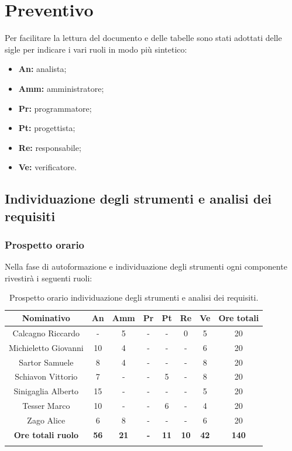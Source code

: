\section{Preventivo}

	Per facilitare la lettura del documento e delle tabelle sono stati adottati delle sigle per indicare i vari ruoli in modo più sintetico:
	\begin{itemize}
		\item \textbf{An:} analista;
		\item \textbf{Amm:} amministratore;
		\item \textbf{Pr:} programmatore;
		\item \textbf{Pt:} progettista;
		\item \textbf{Re:} responsabile;
		\item \textbf{Ve:} verificatore.
	\end{itemize}

%
%
%
%
\subsection{Individuazione degli strumenti e analisi dei requisiti}

\subsubsection{Prospetto orario}

Nella fase di autoformazione e individuazione degli strumenti ogni componente rivestirà i seguenti ruoli:
\begin{longtable}{|c|c|c|c|c|c|c|c|}
	\hline
	\rowcolor[HTML]{F9CB9C} 
	\textbf{Nominativo} & \textbf{An} & \textbf{Amm} & \textbf{Pr} & \textbf{Pt} & \textbf{Re} & \textbf{Ve} & \textbf{Ore totali} \\
	\hline
	Calcagno Riccardo & 
	- & 
	5 & 
	- & 
	- & 
	0 & 
	5 & 
	20 \\
	\hline
	Michieletto Giovanni & 
	10 &
	4 & 
	- & 
	- & 
	- & 
	6 & 
	20 \\
	\hline
	Sartor Samuele & 
	8 & 
	4 & 
	- & 
	- & 
	- & 
	8 & 
	20 \\
	\hline
	Schiavon Vittorio & 
	7 & 
	- & 
	- & 
	5 & 
	- & 
	8 & 
	20 \\
	\hline
	Sinigaglia Alberto & 
	15 & 
	- & 
	- & 
	- & 
	- & 
	5 & 
	20 \\
	\hline
	Tesser Marco & 
	10 & 
	- & 
	- & 
	6 & 
	- & 
	4 & 
	20 \\
	\hline	
	Zago Alice & 
	6 & 
	8 & 
	- & 
	- & 
	- & 
	6 & 
	20 \\
	\hline	
	\rowcolor[HTML]{F9CB9C} 
	\textbf{Ore totali ruolo} & \textbf{56} & \textbf{21} & \textbf{-} & \textbf{11} & \textbf{10} & \textbf{42} & \textbf{140} \\
	\hline
	\caption{Prospetto orario individuazione degli strumenti e analisi dei requisiti.}
	\label{fig: Prospetto orario individuazione degli strumenti e analisi dei requisiti.}
\end{longtable}

